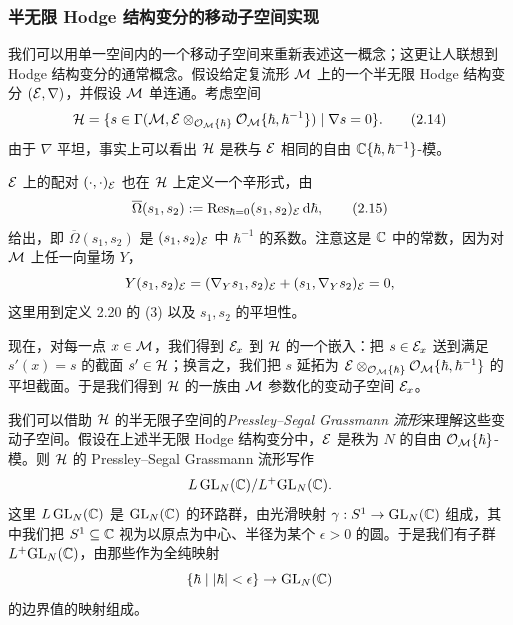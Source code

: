 
\subsubsection{半无限 Hodge 结构变分的移动子空间实现}

我们可以用单一空间内的一个移动子空间来重新表述这一概念；这更让人联想到 Hodge 结构变分的通常概念。假设给定复流形 $\mathcal{M}$ 上的一个半无限 Hodge 结构变分 $(\mathcal{E},\nabla)$，并假设 $\mathcal{M}$ 单连通。考虑空间
\begin{equation}
\mathcal{H}=\{s\in\Gamma(\mathcal{M},\mathcal{E}\otimes_{\mathcal{O}_{\mathcal{M}}\{\hbar\}}\mathcal{O}_{\mathcal{M}}\{\hbar,\hbar^{-1}\})\mid\nabla s=0\}. \tag{2.14}
\end{equation}
由于 $\nabla$ 平坦，事实上可以看出 $\mathcal{H}$ 是秩与 $\mathcal{E}$ 相同的自由 $\mathbb{C}\{\hbar,\hbar^{-1}\}$-模。

$\mathcal{E}$ 上的配对 $(\cdot,\cdot)_{\mathcal{E}}$ 也在 $\mathcal{H}$ 上定义一个辛形式，由
\begin{equation}
\overline{\Omega}(s_1,s_2):=\mathrm{Res}_{\hbar=0}(s_1,s_2)_{\mathcal{E}}\,\mathrm{d}\hbar, \tag{2.15}
\end{equation}
给出，即 $\overline{\Omega}(s_1,s_2)$ 是 $(s_1,s_2)_{\mathcal{E}}$ 中 $\hbar^{-1}$ 的系数。注意这是 $\mathbb{C}$ 中的常数，因为对 $\mathcal{M}$ 上任一向量场 $Y$，
\[
Y(s_1,s_2)_{\mathcal{E}}=(\nabla_Y s_1,s_2)_{\mathcal{E}}+(s_1,\nabla_Y s_2)_{\mathcal{E}}=0,
\]
这里用到定义 2.20 的 (3) 以及 $s_1,s_2$ 的平坦性。

现在，对每一点 $x\in\mathcal{M}$，我们得到 $\mathcal{E}_x$ 到 $\mathcal{H}$ 的一个嵌入：把 $s\in\mathcal{E}_x$ 送到满足 $s'(x)=s$ 的截面 $s'\in\mathcal{H}$；换言之，我们把 $s$ 延拓为 $\mathcal{E}\otimes_{\mathcal{O}_{\mathcal{M}}\{\hbar\}}\mathcal{O}_{\mathcal{M}}\{\hbar,\hbar^{-1}\}$ 的平坦截面。于是我们得到 $\mathcal{H}$ 的一族由 $\mathcal{M}$ 参数化的变动子空间 $\mathcal{E}_x$。

我们可以借助 $\mathcal{H}$ 的半无限子空间的\emph{Pressley–Segal Grassmann 流形}来理解这些变动子空间。假设在上述半无限 Hodge 结构变分中，$\mathcal{E}$ 是秩为 $N$ 的自由 $\mathcal{O}_{\mathcal{M}}\{\hbar\}$-模。则 $\mathcal{H}$ 的 Pressley–Segal Grassmann 流形写作
\[
L\,\mathrm{GL}_N(\mathbb{C})/L^+\mathrm{GL}_N(\mathbb{C}).
\]
这里 $L\,\mathrm{GL}_N(\mathbb{C})$ 是 $\mathrm{GL}_N(\mathbb{C})$ 的环路群，由光滑映射 $\gamma:S^1\to\mathrm{GL}_N(\mathbb{C})$ 组成，其中我们把 $S^1\subseteq\mathbb{C}$ 视为以原点为中心、半径为某个 $\epsilon>0$ 的圆。于是我们有子群 $L^+\mathrm{GL}_N(\mathbb{C})$，由那些作为全纯映射
\[
\{\hbar\mid|\hbar|<\epsilon\}\to\mathrm{GL}_N(\mathbb{C})
\]
的边界值的映射组成。

